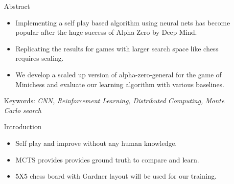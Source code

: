 \documentclass[final]{beamer}
\newlength{\sepwid}
\newlength{\onecolwid}
\begin{document}
\begin{frame}[t] %

\begin{columns}[t] %

\begin{column}{\sepwid}\end{column} %

\begin{column}{\onecolwid} %


\begin{alertblock}{Abstract}

\begin{itemize}
\item Implementing a self play based algorithm using neural nets has become popular after the huge success of Alpha Zero by Deep Mind.
\item Replicating the results for games with larger search space like chess requires scaling. 
\item We develop a scaled up version of alpha-zero-general for the game of Minichess and evaluate our learning algorithm with various baselines.
\end{itemize}
Keywords: \emph{CNN, Reinforcement Learning, Distributed Computing, Monte Carlo search}

\end{alertblock}



\begin{block}{Introduction}

\begin{itemize}
\item Self play and improve without any human knowledge.
\item MCTS provides provides ground truth to compare and learn.
\item 5X5 chess board with Gardner layout will be used for our training. 
\end{itemize}


\end{block}
\end{column}
\end{columns}
\end{frame}
\end{document}
